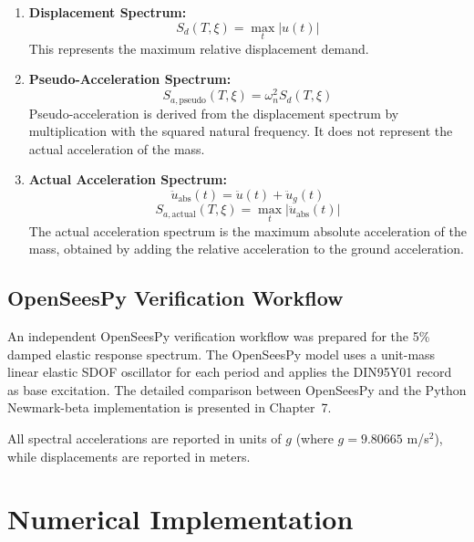 ﻿\documentclass[12pt]{article}
\begin{document}
\begin{enumerate}
    \item \textbf{Displacement Spectrum:}
    \begin{equation}
    S_d(T, \xi) = \max_{t} |u(t)|
    \label{eq:sd}
    \end{equation}
    This represents the maximum relative displacement demand.

    \item \textbf{Pseudo-Acceleration Spectrum:}
    \begin{equation}
    S_{a,\text{pseudo}}(T, \xi) = \omega_n^2 S_d(T, \xi)
    \label{eq:sapseudo}
    \end{equation}
    Pseudo-acceleration is derived from the displacement spectrum by multiplication with the squared natural frequency. It does not represent the actual acceleration of the mass.

    \item \textbf{Actual Acceleration Spectrum:}
    \begin{equation}
    \ddot{u}_{\text{abs}}(t) = \ddot{u}(t) + \ddot{u}_g(t)
    \label{eq:aabs}
    \end{equation}
    \begin{equation}
    S_{a,\text{actual}}(T, \xi) = \max_{t} |\ddot{u}_{\text{abs}}(t)|
    \label{eq:saactual}
    \end{equation}
    The actual acceleration spectrum is the maximum absolute acceleration of the mass, obtained by adding the relative acceleration to the ground acceleration.
\end{enumerate}

\subsection{OpenSeesPy Verification Workflow}

An independent OpenSeesPy verification workflow was prepared for the 5\% damped elastic response spectrum. The OpenSeesPy model uses a unit-mass linear elastic SDOF oscillator for each period and applies the DIN95Y01 record as base excitation. The detailed comparison between OpenSeesPy and the Python Newmark-beta implementation is presented in Chapter~7.

All spectral accelerations are reported in units of \(g\) (where \(g = 9.80665\) m/s\(^2\)), while displacements are reported in meters.

\section{Numerical Implementation}
\end{document}
